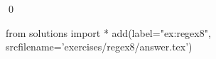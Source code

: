 
\begin{ex} 
  \label{ex:regex8}
  
  \qed
\end{ex} 
\begin{python0}
from solutions import *
add(label="ex:regex8",
    srcfilename='exercises/regex8/answer.tex') 
\end{python0}
